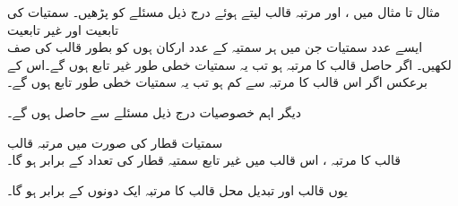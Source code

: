 مثال  تا مثال  میں ،  اور مرتبہ قالب  لیتے ہوئے  درج ذیل مسئلے  کو پڑھیں۔ 
\quad سمتیات کی  تابعیت اور غیر تابعیت\\
ایسے  عدد سمتیات جن میں ہر سمتیہ کے  عدد ارکان ہوں کو بطور قالب کی  صف لکھیں۔ اگر حاصل قالب کا مرتبہ  ہو تب یہ سمتیات خطی طور غیر تابع ہوں گے۔اس کے برعکس اگر اس قالب کا مرتبہ  سے کم ہو تب یہ سمتیات خطی طور تابع ہوں گے۔

دیگر اہم خصوصیات درج ذیل مسئلے سے حاصل ہوں گے۔

\quad سمتیات قطار کی صورت میں مرتبہ قالب\\
قالب  کا مرتبہ ، اس قالب میں غیر تابع سمتیہ قطار کی تعداد کے برابر ہو گا۔

یوں قالب  اور تبدیل محل قالب  کا مرتبہ ایک دونوں کے  برابر ہو گا۔ 


